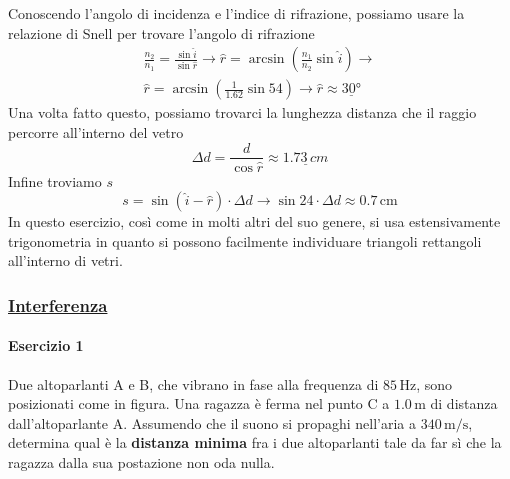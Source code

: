 Conoscendo l'angolo di incidenza e l'indice di rifrazione, possiamo usare la relazione di Snell per
trovare l'angolo di rifrazione
\begin{align*}
  \frac{n_2}{n_1} = \frac{\sin\hat{i}}{\sin\hat{r}} \rightarrow
  \hat{r} = \arcsin\left(\frac{n_1}{n_2}\sin\hat{i}\right) \rightarrow\\
  \hat{r} = \arcsin\left(\frac{1}{1.62}\sin54\right) \rightarrow
  \hat{r} \approx \underline{\ang{30}}
\end{align*}
Una volta fatto questo, possiamo trovarci la lunghezza distanza che il raggio percorre all'interno
del vetro
\begin{equation*}
  \Delta d = \frac{d}{\cos\hat{r}} \approx \underline{1.73\,cm}
\end{equation*}
Infine troviamo $s$
\begin{equation*}
  s = \sin(\hat{i}-\hat{r})\cdot\Delta d \rightarrow \sin24\cdot\Delta d \approx \boxed{0.7\,\text{cm}}
\end{equation*}
In questo esercizio, così come in molti altri del suo genere, si usa estensivamente trigonometria
in quanto si possono facilmente individuare triangoli rettangoli all'interno di vetri.

\subsubsection*{\hyperref[subsec:onde:interferenza]{Interferenza}}\label{ex:interferenza}
\paragraph{Esercizio 1}
Due altoparlanti A e B, che vibrano in fase alla frequenza di $85\,\text{Hz}$, sono posizionati come 
in figura. Una ragazza è ferma nel punto C a $1.0\,\text{m}$ di distanza dall'altoparlante A. 
Assumendo che il suono si propaghi nell'aria a $340\,\text{m/s}$, determina qual è la 
\textbf{distanza minima} fra i due altoparlanti tale da far sì che la ragazza dalla sua postazione 
non oda nulla.
\begin{center}
\end{center}
\divisor


